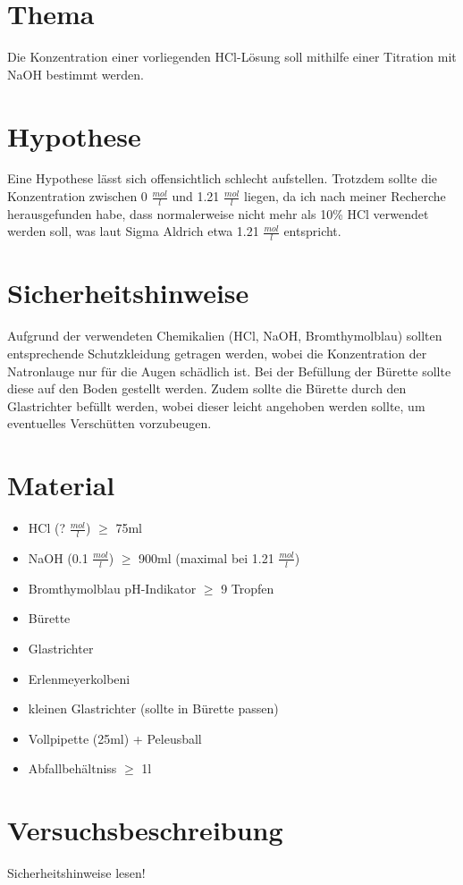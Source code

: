 \documentclass[8pt, letterpaper]{article}
\newcommand{\mpl}[1]{#1 \(\frac{mol}{l}\)}
\begin{document}
\section{Thema}
Die Konzentration einer vorliegenden HCl-Lösung soll mithilfe einer Titration mit NaOH bestimmt werden.

\section{Hypothese}
Eine Hypothese lässt sich offensichtlich schlecht aufstellen. Trotzdem sollte die Konzentration zwischen \mpl{0} und \mpl{1.21} liegen, da ich nach meiner Recherche herausgefunden habe, dass normalerweise nicht mehr als 10\% HCl verwendet werden soll, was laut Sigma Aldrich etwa \mpl{1.21} entspricht.

\section{Sicherheitshinweise}
Aufgrund der verwendeten Chemikalien (HCl, NaOH, Bromthymolblau) sollten entsprechende Schutzkleidung getragen werden, wobei die Konzentration der Natronlauge nur für die Augen schädlich ist.
Bei der Befüllung der Bürette sollte diese auf den Boden gestellt werden. Zudem sollte die Bürette durch den Glastrichter befüllt werden, wobei dieser leicht angehoben werden sollte, um eventuelles Verschütten vorzubeugen.

\section{Material}
\begin{itemize}
    \item HCl (\mpl{?}) \(\ge\) 75ml
    \item NaOH (\mpl{0.1}) \(\ge\) 900ml (maximal bei \mpl{1.21})
    \item Bromthymolblau pH-Indikator \(\ge\) 9 Tropfen
    \item Bürette
    \item Glastrichter
    \item Erlenmeyerkolbeni
    \item kleinen Glastrichter (sollte in Bürette passen)
    \item Vollpipette (25ml) + Peleusball
    \item Abfallbehältniss \(\ge\) 1l
\end{itemize}

\section{Versuchsbeschreibung}
Sicherheitshinweise lesen!
\end{document}
